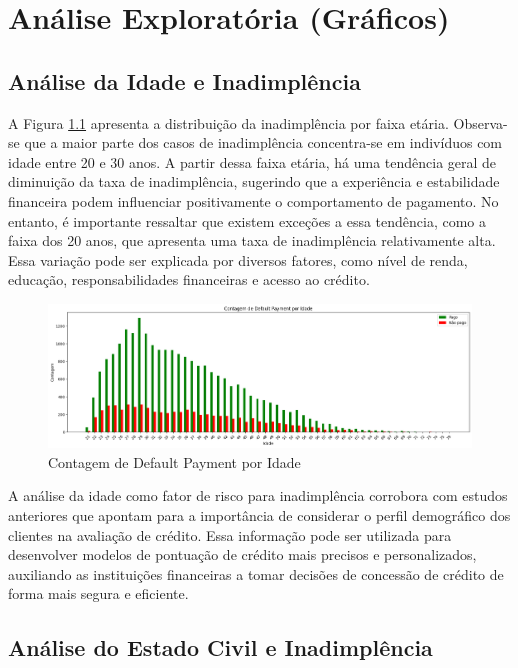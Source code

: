 \documentclass{abntpuc}
\begin{document}
\chapter{Análise Exploratória (Gráficos)}
\section{Análise da Idade e Inadimplência}

A Figura \ref{fig:grafico1} apresenta a distribuição da inadimplência por faixa etária. Observa-se que a maior parte dos casos de inadimplência concentra-se em indivíduos com idade entre 20 e 30 anos. A partir dessa faixa etária, há uma tendência geral de diminuição da taxa de inadimplência, sugerindo que a experiência e estabilidade financeira podem influenciar positivamente o comportamento de pagamento. No entanto, é importante ressaltar que existem exceções a essa tendência, como a faixa dos 20 anos, que apresenta uma taxa de inadimplência relativamente alta. Essa variação pode ser explicada por diversos fatores, como nível de renda, educação, responsabilidades financeiras e acesso ao crédito.

\begin{figure}[H]
    \centering
    \includegraphics[width=\textwidth]{grafico1.png}
    \caption{Contagem de Default Payment por Idade}
    \label{fig:grafico1}
\end{figure}

A análise da idade como fator de risco para inadimplência corrobora com estudos anteriores que apontam para a importância de considerar o perfil demográfico dos clientes na avaliação de crédito. Essa informação pode ser utilizada para desenvolver modelos de pontuação de crédito mais precisos e personalizados, auxiliando as instituições financeiras a tomar decisões de concessão de crédito de forma mais segura e eficiente.

\section{Análise do Estado Civil e Inadimplência}
\end{document}
